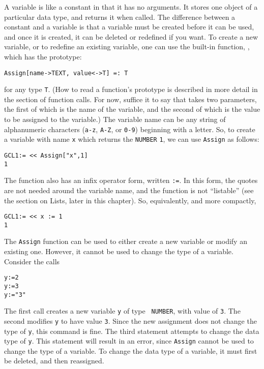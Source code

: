 A variable is like a constant in that it has no arguments.  It stores
one object of a particular data type, and returns it when called. The
difference between a constant and a variable is that a variable must
be created before it can be used, and once it is created, it can be
deleted or redefined if you want.  To create a new variable, or to
redefine an existing variable, one can use the built-in function,
, which has the prototype:
\begin{verbatim}
Assign[name->TEXT, value<->T] =: T
\end{verbatim}
\noindent 
for any type \verb+T+.  (How to read a function's prototype is
described in more detail in the section of function calls.  For now,
suffice it to say that  takes two parameters, the first of
which is the name of the variable, and the second of which is the
value to be assigned to the variable.)  The variable name can be any
string of alphanumeric characters (\verb+a-z+, \verb+A-Z+, or
\verb+0-9+) beginning with a letter.  So, to create a variable with
name \verb+x+ which returns the \verb+NUMBER+ \verb+1+, we can use
\verb+Assign+ as follows:

\begin{verbatim}
GCL1:= << Assign["x",1]
1
\end{verbatim}


\noindent 
The  function also has an infix operator form, written
{\tt :=}.  In this form, the quotes are not needed around the variable
name, and the function is not ``listable'' (see the section on Lists,
later in this chapter).  So, equivalently, and more compactly,

\begin{verbatim}
GCL1:= << x := 1
1
\end{verbatim}

The {\tt Assign} function can be used to either create a new variable or
modify an existing one.  However, it cannot be used to change the type
of a variable.  Consider the calls

\begin{verbatim}
y:=2
y:=3
y:="3"
\end{verbatim}
\noindent The first call creates a new variable {\tt y} of type {\tt
NUMBER}, with value of \verb+3+.  The second modifies \verb+y+ to
have value \verb+3+.  Since the new assignment does not change the
type of \verb+y+, this command is fine.  The third statement attempts
to change the data type of \verb+y+.  This statement will result in an
error, since {\tt Assign} cannot be used to change the type of a
variable.  To change the data type of a variable, it must first be
deleted, and then reassigned.  

